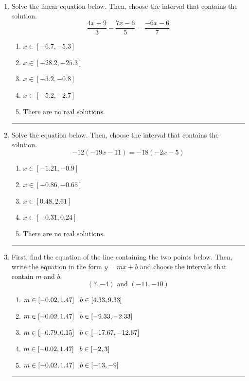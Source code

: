 \documentclass[14pt]{extbook}
\newcommand{\litem}[1]{\item#1\hspace*{-1cm}\rule{\textwidth}{0.4pt}}
\begin{document}
\begin{enumerate}
\litem{
Solve the linear equation below. Then, choose the interval that contains the solution.\[ \frac{4x + 9}{3} - \frac{7x -6}{5} = \frac{-6x -6}{7} \]\begin{enumerate}[label=\Alph*.]
\item \( x \in [-6.7, -5.3] \)
\item \( x \in [-28.2, -25.3] \)
\item \( x \in [-3.2, -0.8] \)
\item \( x \in [-5.2, -2.7] \)
\item \( \text{There are no real solutions.} \)

\end{enumerate} }
\litem{
Solve the equation below. Then, choose the interval that contains the solution.\[ -12(-19x -11) = -18(-2x -5) \]\begin{enumerate}[label=\Alph*.]
\item \( x \in [-1.21, -0.9] \)
\item \( x \in [-0.86, -0.65] \)
\item \( x \in [0.48, 2.61] \)
\item \( x \in [-0.31, 0.24] \)
\item \( \text{There are no real solutions.} \)

\end{enumerate} }
\litem{
First, find the equation of the line containing the two points below. Then, write the equation in the form $ y=mx+b $ and choose the intervals that contain $m$ and $b$.\[ (7, -4) \text{ and } (-11, -10) \]\begin{enumerate}[label=\Alph*.]
\item \( m \in [-0.02, 1.47] \hspace*{3mm} b \in [4.33, 9.33] \)
\item \( m \in [-0.02, 1.47] \hspace*{3mm} b \in [-9.33, -2.33] \)
\item \( m \in [-0.79, 0.15] \hspace*{3mm} b \in [-17.67, -12.67] \)
\item \( m \in [-0.02, 1.47] \hspace*{3mm} b \in [-2, 3] \)
\item \( m \in [-0.02, 1.47] \hspace*{3mm} b \in [-13, -9] \)


\end{enumerate}}
\end{enumerate}
\end{document}
